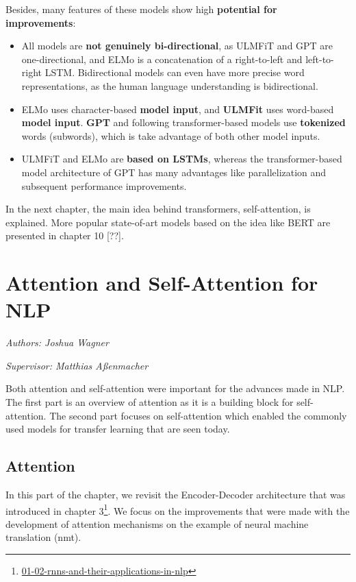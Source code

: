 \documentclass[]{krantz}
\providecommand{\tightlist}{%
  \setlength{\itemsep}{0pt}\setlength{\parskip}{0pt}}
\renewcommand{\href}[2]{#2\footnote{\url{#1}}}
\begin{document}
Besides, many features of these models show high \textbf{potential for improvements}:

\begin{itemize}
\tightlist
\item
  All models are \textbf{not genuinely bi-directional}, as ULMFiT and GPT are one-directional, and ELMo is a concatenation of a right-to-left and left-to-right LSTM. Bidirectional models can even have more precise word representations, as the human language understanding is bidirectional.
\item
  ELMo uses character-based \textbf{model input}, and \textbf{ULMFit} uses word-based \textbf{model input}. \textbf{GPT} and following transformer-based models use \textbf{tokenized} words (subwords), which is take advantage of both other model inputs.
\item
  ULMFiT and ELMo are \textbf{based on LSTMs}, whereas the transformer-based model architecture of GPT has many advantages like parallelization and subsequent performance improvements.
\end{itemize}

In the next chapter, the main idea behind transformers, self-attention, is explained. More popular state-of-art models based on the idea like BERT are presented in chapter 10 {[}??{]}.

\hypertarget{attention-and-self-attention-for-nlp}{%
\chapter{Attention and Self-Attention for NLP}\label{attention-and-self-attention-for-nlp}}

\emph{Authors: Joshua Wagner}

\emph{Supervisor: Matthias Aßenmacher}

Both attention and self-attention were important for the advances made in NLP.
The first part is an overview of attention as it is a building block for self-attention.
The second part focuses on self-attention which enabled the commonly used models
for transfer learning that are seen today.

\hypertarget{attention}{%
\section{Attention}\label{attention}}

In this part of the chapter, we revisit the Encoder-Decoder architecture that was introduced
in chapter \href{01-02-rnns-and-their-applications-in-nlp}{3}. We focus on the improvements
that were made with the development of attention mechanisms on the example of neural machine translation (nmt).
\end{document}
